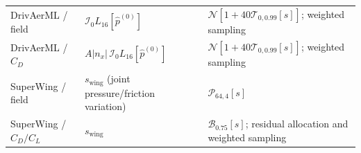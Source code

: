 \begin{table}[!htbp]
\begin{tabular}{@{}>{\raggedright\arraybackslash}p{}>{\raggedright\arraybackslash}p{}>{\raggedright\arraybackslash}p{}@{}}
        \addlinespace[3pt]
        DrivAerML / field & $\mathcal{I}_0 L_{16}[\widehat p^{(0)}]$ & $\mathcal{N}[1+40\mathcal{T}_{0,0.99}[s]]$; weighted sampling \\
        \addlinespace[3pt]
        DrivAerML / $C_D$ & $A|n_x|\,\mathcal{I}_0 L_{16}[\widehat p^{(0)}]$ & $\mathcal{N}[1+40\mathcal{T}_{0,0.99}[s]]$; weighted sampling \\
        \addlinespace[3pt]
        SuperWing / field & $s_{\mathrm{wing}}$ (joint pressure/friction variation) & $\mathcal{P}_{64,4}[s]$ \\
        \addlinespace[3pt]
        SuperWing / $C_D/C_L$ & $s_{\mathrm{wing}}$ & $\mathcal{B}_{0.75}[s]$; residual allocation and weighted sampling \\
        \bottomrule
    \end{tabular}
\end{table}
